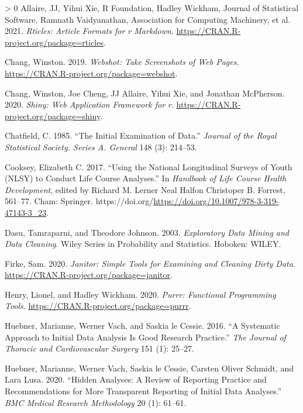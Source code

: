 \documentclass[12pt]{article}
\newlength{\cslhangindent}
\newenvironment{CSLReferences}[3] %
 {%
  \setlength{\parindent}{0pt}
  \ifodd #1 \everypar{\setlength{\hangindent}{\cslhangindent}}\ignorespaces\fi
  \ifnum #2 > 0
  \setlength{\parskip}{#2\baselineskip}
  \fi
 }%
 {}
\begin{document}
\hypertarget{refs}{}
\begin{CSLReferences}{1}{0}
\leavevmode\hypertarget{ref-rticles}{}%
Allaire, JJ, Yihui Xie, R Foundation, Hadley Wickham, Journal of Statistical Software, Ramnath Vaidyanathan, Association for Computing Machinery, et al. 2021. \emph{Rticles: Article Formats for r Markdown}. \url{https://CRAN.R-project.org/package=rticles}.

\leavevmode\hypertarget{ref-webshot}{}%
Chang, Winston. 2019. \emph{Webshot: Take Screenshots of Web Pages}. \url{https://CRAN.R-project.org/package=webshot}.

\leavevmode\hypertarget{ref-shiny}{}%
Chang, Winston, Joe Cheng, JJ Allaire, Yihui Xie, and Jonathan McPherson. 2020. \emph{Shiny: Web Application Framework for r}. \url{https://CRAN.R-project.org/package=shiny}.

\leavevmode\hypertarget{ref-Chatfield1985TIEo}{}%
Chatfield, C. 1985. {``The Initial Examination of Data.''} \emph{Journal of the Royal Statistical Society. Series A. General} 148 (3): 214--53.

\leavevmode\hypertarget{ref-eliznlsy}{}%
Cooksey, Elizabeth C. 2017. {``Using the National Longitudinal Surveys of Youth (NLSY) to Conduct Life Course Analyses.''} In \emph{Handbook of Life Course Health Development}, edited by Richard M. Lerner Neal Halfon Christoper B. Forrest, 561--77. Cham: Springer. https://doi.org/\url{https://doi.org/10.1007/978-3-319-47143-3_23}.

\leavevmode\hypertarget{ref-DasuTamraparni2003Edma}{}%
Dasu, Tamraparni, and Theodore Johnson. 2003. \emph{Exploratory Data Mining and Data Cleaning}. Wiley Series in Probability and Statistics. Hoboken: WILEY.

\leavevmode\hypertarget{ref-janitor}{}%
Firke, Sam. 2020. \emph{Janitor: Simple Tools for Examining and Cleaning Dirty Data}. \url{https://CRAN.R-project.org/package=janitor}.

\leavevmode\hypertarget{ref-purrr}{}%
Henry, Lionel, and Hadley Wickham. 2020. \emph{Purrr: Functional Programming Tools}. \url{https://CRAN.R-project.org/package=purrr}.

\leavevmode\hypertarget{ref-HuebnerMariannePhD2016Asat}{}%
Huebner, Marianne, Werner Vach, and Saskia le Cessie. 2016. {``A Systematic Approach to Initial Data Analysis Is Good Research Practice.''} \emph{The Journal of Thoracic and Cardiovascular Surgery} 151 (1): 25--27.

\leavevmode\hypertarget{ref-HuebnerMarianne2020Haar}{}%
Huebner, Marianne, Werner Vach, Saskia le Cessie, Carsten Oliver Schmidt, and Lara Lusa. 2020. {``Hidden Analyses: A Review of Reporting Practice and Recommendations for More Transparent Reporting of Initial Data Analyses.''} \emph{BMC Medical Research Methodology} 20 (1): 61--61.


\end{CSLReferences}
\end{document}
